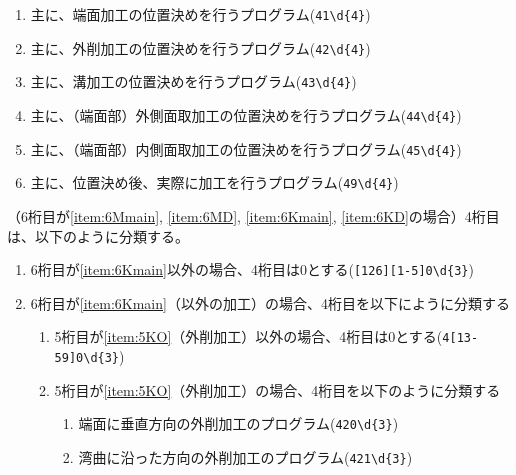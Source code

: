 \begin{enumerate}[label=\alph*)]
  \begin{enumerate}[label=\arabic*., ref=\arabic*, start=1]
  \item\label{item:5KF} 主に、端面加工の位置決めを行うプログラム(\verb|41\d{4}|)
  \item\label{item:5KO} 主に、外削加工の位置決めを行うプログラム(\verb|42\d{4}|)
  \item\label{item:5KK} 主に、溝加工の位置決めを行うプログラム(\verb|43\d{4}|)
  \item\label{item:5KCO} 主に、（端面部）外側面取加工の位置決めを行うプログラム(\verb|44\d{4}|)
  \item\label{item:5KCI} 主に、（端面部）内側面取加工の位置決めを行うプログラム(\verb|45\d{4}|)
  \setcounter{enumii}{8}
  \item 主に、位置決め後、実際に加工を行うプログラム(\verb|49\d{4}|)
  \end{enumerate}
\end{enumerate}


（6桁目が\ref{item:6Mmain}, \ref{item:6MD}, \ref{item:6Kmain}, \ref{item:6KD}の場合）4桁目は、以下のように分類する。
\begin{enumerate}[label=\alph*), ref=\alph*)]
\item 6桁目が\ref{item:6Kmain}\hx 以外の場合、4桁目は0とする(\verb|[126][1-5]0\d{3}|)
\item 6桁目が\ref{item:6Kmain}（\dimple 以外の加工）の場合、4桁目を以下にように分類する
  \begin{enumerate}[label=\alph{enumi}\,-\arabic*), leftmargin=\leftmargini]
  \item 5桁目が\ref{item:5KO}（外削加工）以外の場合、4桁目は0とする(\verb|4[13-59]0\d{3}|)
  \item 5桁目が\ref{item:5KO}（外削加工）の場合、4桁目を以下のように分類する
    \begin{enumerate}[label=\arabic*., ref=\arabic*, start=0, leftmargin=*]
    \item 端面に垂直方向の外削加工のプログラム(\verb|420\d{3}|)
    \item 湾曲に沿った方向の外削加工のプログラム(\verb|421\d{3}|)
    \end{enumerate}
  \end{enumerate}
\end{enumerate}



